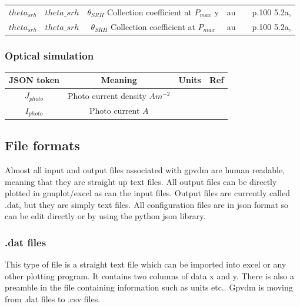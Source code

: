 \begin{landscape}
\begin{center}
\begin{tabular}{ |c|c|c|c| c| c|}
$theta_{srh}$ 	&$theta\_{srh}$ & $\theta_{SRH}$ Collection coefficient at $P_{max}$ y & au &&p.100 5.2a\cite{Summon-FETCH-bonn_catalog_45326403},\cite{PhysRevApplied.6.024001}\\
$theta_{srh}$ 	&$theta\_{srh}$ & $\theta_{SRH}$ Collection coefficient at $P_{max}$ & au &&p.100 5.2a\cite{Summon-FETCH-bonn_catalog_45326403},\cite{PhysRevApplied.6.024001}\\


\hline
\end{tabular}

\end{center}

\end{landscape}

\subsubsection{Optical simulation}

\begin{center}
\begin{tabular}{ |c|c|c| c|} 
\hline
JSON token & Meaning & Units & Ref \\
\hline
$J_{photo}$ & Photo current density $Am^{-2}$& &\\
$I_{photo}$ & Photo current $A$& &\\


\hline
\end{tabular}
\end{center}


\subsection{File formats}
Almost all input and output files associated with gpvdm are human readable, meaning that they are straight up text files.  All output files can be directly plotted in gnuplot/excel as can the input files.  Output files are currently called .dat, but they are simply text files. All configuration files are in json format so can be edit directly or by using the python json library.

\subsubsection{.dat files}
This type of file is a straight text file which can be imported into excel or any other plotting program. It contains two columns of data x and y. There is also a preamble in the file containing information such as units etc..  Gpvdm is moving from .dat files to .csv files.

